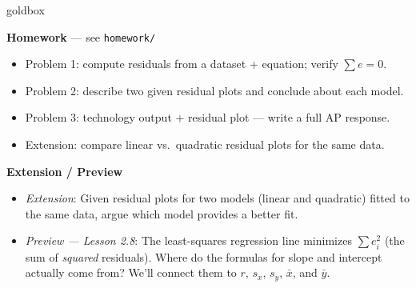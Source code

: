 \documentclass[10pt]{article}
\begin{document}
\begin{skillbox}{goldbox}
\begin{minipage}[t]{0.48\linewidth}
    \textbf{Homework} --- see \texttt{homework/}
    \begin{itemize}
        \item Problem 1: compute residuals from a dataset + equation; verify $\sum e = 0$.
        \item Problem 2: describe two given residual plots and conclude about each model.
        \item Problem 3: technology output + residual plot --- write a full AP response.
        \item Extension: compare linear vs.\ quadratic residual plots for the same data.
    \end{itemize}
\end{minipage}
\hfill
\begin{minipage}[t]{0.48\linewidth}
    \textbf{Extension / Preview}
    \begin{itemize}
        \item \textit{Extension}: Given residual plots for two models (linear and quadratic)
              fitted to the same data, argue which model provides a better fit.
        \item \textit{Preview --- Lesson 2.8}: The least-squares regression line minimizes
              $\sum e_i^2$ (the sum of \textit{squared} residuals). Where do the formulas for
              slope and intercept actually come from? We'll connect them to $r$, $s_x$, $s_y$,
              $\bar{x}$, and $\bar{y}$.
    \end{itemize}
\end{minipage}
\end{skillbox}
\end{document}
